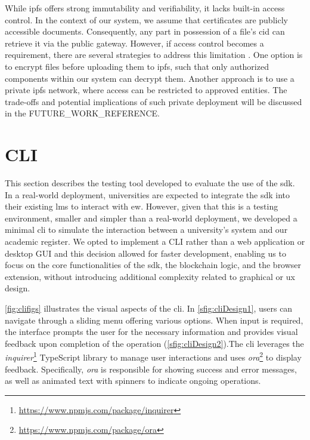 While \acrshort{ipfs} offers strong immutability and verifiability, it lacks built-in access control. In the context of our system, we assume that certificates are publicly accessible documents. Consequently, any part in possession of a file's \acrshort{cid} can retrieve it via the public gateway. However, if access control becomes a requirement, there are several strategies to address this limitation \cite{barbaraanrealaura2021datapersistence}. One option is to encrypt files before uploading them to \acrshort{ipfs}, such that only authorized components within our system can decrypt them. Another approach is to use a private \acrshort{ipfs} network, where access can be restricted to approved entities. The trade-offs and potential implications of such private deployment will be discussed in the FUTURE\_WORK\_REFERENCE.

\section{CLI}
\label{sec:cliDesign}
This section describes the testing tool developed to evaluate the use of the \acrshort{sdk}. In a real-world deployment, universities are expected to integrate the \acrshort{sdk} into their existing \acrshort{lms} to interact with \acrlong{ew}. However, given that this is a testing environment, smaller and simpler than a real-world deployment, we developed a minimal \acrlong{cli} to simulate the interaction between a university's system and our academic register. We opted to implement a CLI rather than a web application or desktop GUI and this decision allowed for faster development, enabling us to focus on the core functionalities of the \acrshort{sdk}, the blockchain logic, and the browser extension, without introducing additional complexity related to graphical or \acrfull{ux} design.

\cref{fig:clifigs} illustrates the visual aspects of the \acrshort{cli}. In \cref{sfig:cliDesign1}, users can navigate through a sliding menu offering various options. When input is required, the interface prompts the user for the necessary information and provides visual feedback upon completion of the operation (\cref{sfig:cliDesign2}).The \acrshort{cli} leverages the \textit{inquirer}\footnote{\url{https://www.npmjs.com/package/inquirer}} TypeScript library to manage user interactions and uses \textit{ora}\footnote{\url{https://www.npmjs.com/package/ora}} to display feedback. Specifically, \textit{ora} is responsible for showing success and error messages, as well as animated text with spinners to indicate ongoing operations.

